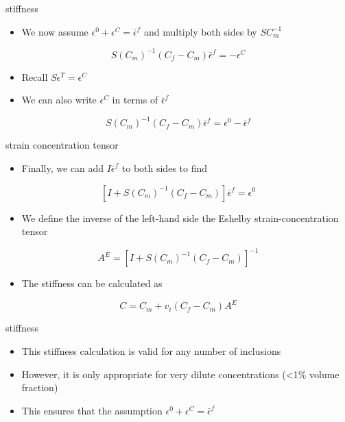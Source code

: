 \documentclass[
  letterpaper,
  ignorenonframetext,
  aspectratio=43,
  handout,
  12pt]{beamer}
\providecommand{\tightlist}{%
  \setlength{\itemsep}{0pt}\setlength{\parskip}{0pt}}
\providecommand{\tightlist}{%
\setlength{\itemsep}{0pt}\setlength{\parskip}{0pt}}
\begin{document}
\begin{frame}{stiffness}
\protect\hypertarget{stiffness-1}{}
\begin{itemize}
\tightlist
\item
  We now assume \(\epsilon^0 + \epsilon^C = \bar{\epsilon}^f\) and
  multiply both sides by \(S C_m^{-1}\)
\end{itemize}

\[S \left( C_m \right ) ^{-1} \left ( C_f - C_m \right ) \bar{\epsilon}^f = -\epsilon^C\]

\begin{itemize}
\tightlist
\item
  Recall \(S\epsilon^T = \epsilon^C\)
\item
  We can also write \(\epsilon^C\) in terms of \(\bar{\epsilon}^f\)
\end{itemize}

\[S \left( C_m \right ) ^{-1} \left ( C_f - C_m \right ) \bar{\epsilon}^f = \epsilon^0- \bar{\epsilon}^f\]
\end{frame}

\begin{frame}{strain concentration tensor}
\protect\hypertarget{strain-concentration-tensor}{}
\begin{itemize}
\tightlist
\item
  Finally, we can add \(I\bar{\epsilon}^f\) to both sides to find
\end{itemize}

\[[I+S \left( C_m \right ) ^{-1} \left ( C_f - C_m \right )] \bar{\epsilon}^f = \epsilon^0\]

\begin{itemize}
\tightlist
\item
  We define the inverse of the left-hand side the Eshelby
  strain-concentration tensor
\end{itemize}

\[A^E = [I+S \left( C_m \right ) ^{-1} \left ( C_f - C_m \right )]^{-1}\]

\begin{itemize}
\tightlist
\item
  The stiffness can be calculated as
\end{itemize}

\[C = C_m + v_i (C_f-C_m)A^E\]
\end{frame}

\begin{frame}{stiffness}
\protect\hypertarget{stiffness-2}{}
\begin{itemize}
\tightlist
\item
  This stiffness calculation is valid for any number of inclusions
\item
  However, it is only appropriate for very dilute concentrations
  (\textless1\% volume fraction)
\item
  This ensures that the assumption
  \(\epsilon^0 + \epsilon^C = \bar{\epsilon}^f\)
\end{itemize}
\end{frame}
\end{document}
